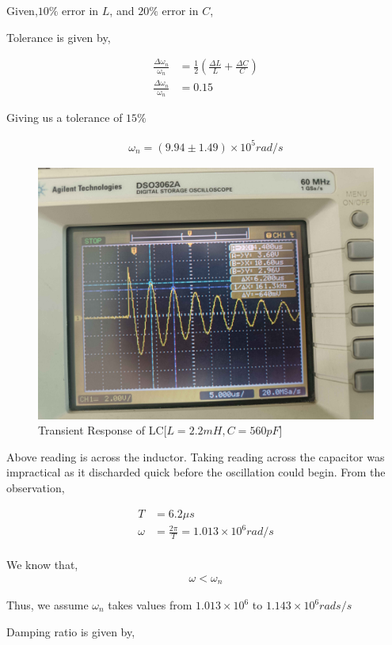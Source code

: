 \documentclass[journal]{IEEEtran}
\begin{document}
Given,$10\%$ error in $L$, and $20\%$ error in $C$,

Tolerance is given by,

\begin{align*}
	\frac{\Delta \omega_n}{\omega_n} &= \frac{1}{2}\left(\frac{\Delta L}{L} + \frac{\Delta C}{C}\right)\\
	\frac{\Delta\omega_n}{\omega_n} &= 0.15 
\end{align*}

Giving us a tolerance of $15\%$

\begin{align*}
	\omega_n = (9.94 \pm 1.49) \times 10^5 rad/s
\end{align*}

\begin{figure}[h]
	\centering
	\includegraphics[width=0.7\columnwidth]{pics/560pF.jpg}
	\caption{Transient Response of LC[$L = 2.2mH, C=560pF$]}
\end{figure}

Above reading is across the inductor. Taking reading across the capacitor was impractical as it discharded quick before the oscillation could begin.
From the observation,

\begin{align*}
    T &= 6.2\mu s\\
    \omega &= \frac{2\pi}{T} = 1.013 \times 10^{6} rad/s\\
\end{align*}

We know that, 
\begin{align*}
	\omega < \omega_n
\end{align*}

Thus, we assume $\omega_n$ takes values from $1.013\times10^6$ to $1.143\times10^6 rads/s$

Damping ratio is given by,
\end{document}
